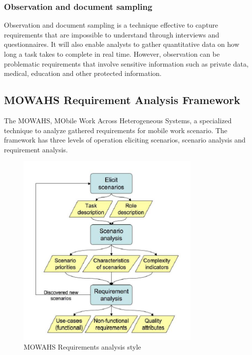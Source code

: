\subsubsection{Observation and document sampling}

Observation and document sampling is a technique effective to capture
requirements that are impossible to understand through interviews and
questionnaires. It will also enable analysts to gather quantitative data on how
long a task takes to complete in real time. However, observation can be
problematic requirements that involve sensitive information such as private
data, medical, education and other protected information.

\subsection{MOWAHS Requirement Analysis Framework}
The MOWAHS, MObile Work Across Heterogeneous Systems, a specialized technique
to analyze gathered requirements for mobile work scenario.  The framework has
three levels of operation eliciting scenarios, scenario analysis and
requirement analysis.\cite{wiki:MOWAHS}

\begin{figure}[htb]
	\centering
	 \includegraphics[width=0.8\textwidth]{prestudy/mowahs_style.PNG}
	\caption{MOWAHS Requirements analysis style}
	\label{fig:mowahs}
\end{figure}


